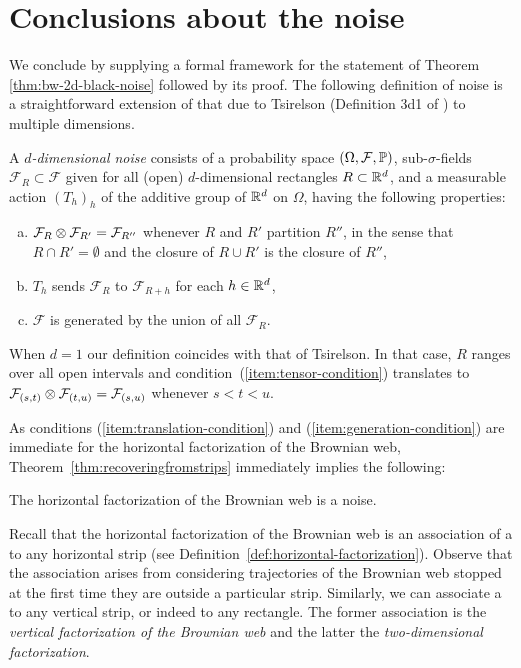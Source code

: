 {
\section{Conclusions about the noise}
\label{sec:conclusions-about-the-noise}

We conclude by supplying a formal framework for the statement of
Theorem \ref{thm:bw-2d-black-noise} followed by its proof.
The following definition of noise is a straightforward extension of
that due to Tsirelson (Definition
3d1 of \cite{tsirelson-nonclassical-stochastic-flows})
to multiple dimensions.

\newcommand{\F}{\mathcal{F}}
A \emph{$d$-dimensional noise} consists of a probability space $(\Omega,\F,
\P)$, sub-$\sigma$-fields $\F_R \subset \F$ given for all (open)
$d$-dimensional rectangles $R \subset \mathbb{R}^d$, and a measurable action
$(T_h)_h$ of the additive group of $\mathbb{R}^d$ on $\Omega$, having the following properties:

\begin{enumerate}[(a)]
\item \label{item:tensor-condition} $\F_R \tensor \F_{R'} = \F_{R''}$ whenever
$R$ and $R'$ partition $R''$, in the sense that
$R\cap R'=\emptyset$ and the closure of $R \cup R'$
is the closure of $R''$,
\item \label{item:translation-condition} $T_h$ sends $\F_R$ to $\F_{R+h}$ for each $h \in \mathbb{R}^d$,
\item \label{item:generation-condition} $\F$ is generated by the union of all $\F_R$.
\end{enumerate}

When $d = 1$ our definition coincides with that of Tsirelson.
In that case, $R$ ranges over all open intervals
and condition~(\ref{item:tensor-condition}) translates to
$\F_{(s,t)} \tensor \F_{(t,u)} = \F_{(s,u)}$ whenever $s < t < u$.

As conditions (\ref{item:translation-condition}) and
(\ref{item:generation-condition}) are immediate for
the horizontal factorization of the Brownian web,
Theorem~\ref{thm:recoveringfromstrips} immediately
implies the following:

\begin{proposition*}
The horizontal factorization of the Brownian web is a noise.
\end{proposition*}

Recall that the horizontal factorization of the Brownian web is an
association of a \sigfield{} to any horizontal strip (see
Definition~\ref{def:horizontal-factorization}).
Observe that the association arises from considering trajectories of the Brownian
web stopped at the first time they are outside a particular strip.
Similarly, we can associate a \sigfield{} to any vertical strip, or
indeed to any rectangle.  The former association is the \emph{vertical
  factorization of the Brownian web} and the latter the
\emph{two-dimensional factorization}.

}
